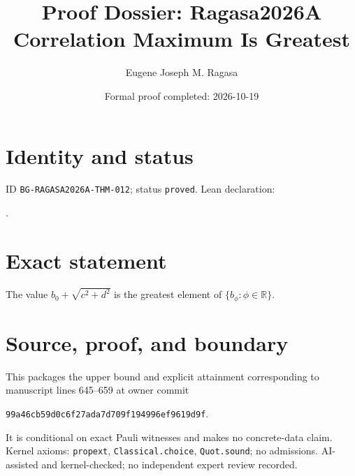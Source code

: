 \documentclass[11pt]{article}
\title{Proof Dossier: Ragasa2026A Correlation Maximum Is Greatest}\author{Eugene Joseph M. Ragasa}\date{Formal proof completed: 2026-10-19}
\begin{document}
\maketitle
\section{Identity and status}
ID \texttt{BG-RAGASA2026A-THM-012}; status \texttt{proved}. Lean declaration:
\par{}.
\section{Exact statement}
The value $b_0+\sqrt{c^2+d^2}$ is the greatest element of
$\{b_\phi:\phi\in\mathbb R\}$.
\section{Source, proof, and boundary}
This packages the upper bound and explicit attainment corresponding to manuscript lines
645--659 at owner commit
\begin{center}\small\texttt{99a46cb59d0c6f27ada7d709f194996ef9619d9f}.\end{center}
It is conditional on exact Pauli witnesses and makes no concrete-data claim.
Kernel axioms: \texttt{propext}, \texttt{Classical.choice}, \texttt{Quot.sound}; no
admissions. AI-assisted and kernel-checked; no independent expert review recorded.
\end{document}
